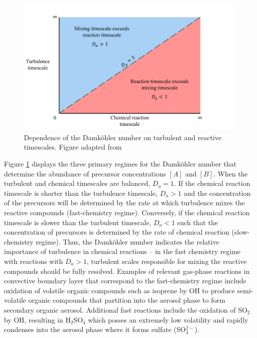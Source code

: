 \begin{figure}[h]
	\centering
	\includegraphics[width=\textwidth]{figures/chapter2/damkohler_number_figure.pdf}
	\caption{Dependence of the Damköhler number on turbulent and reactive timescales. Figure adapted from \cite{kotamarthi_and_2017}}
	\label{fig:damkohler}
\end{figure}

Figure \ref{fig:damkohler} displays the three primary regimes for the Damköhler number that determine the abundance of precursor concentrations $[A]$ and $[B]$. When the turbulent and chemical timescales are balanced, $D_a = 1$. If the chemical reaction timescale is shorter than the turbulence timescale, $D_a >1$ and the concentration of the precursors will be determined by the rate at which turbulence mixes the reactive compounds (fast-chemistry regime). Conversely, if the chemical reaction timescale is slower than the turbulent timescale, $D_a<1$ such that the concentration of precursors is determined by the rate of chemical reaction (slow-chemistry regime). Thus, the Damköhler number indicates the relative importance of turbulence in chemical reactions -- in the fast chemistry regime with  reactions with $D_a > 1$, turbulent scales responsible for mixing the reactive compounds should be fully resolved. Examples of relevant gas-phase reactions in convective boundary layer that correspond to the fast-chemistry regime include oxidation of volatile organic compounds such as isoprene by OH to produce semi-volatile organic compounds that partition into the aerosol phase to form secondary organic aerosol. Additional fast reactions include the oxidation of SO$_2$ by OH, resulting in H$_2$SO$_4$ which posses an extremely low volatility and rapidly condenses into the aerosol phase where it forms sulfate (SO$_4^{2-}$). 

